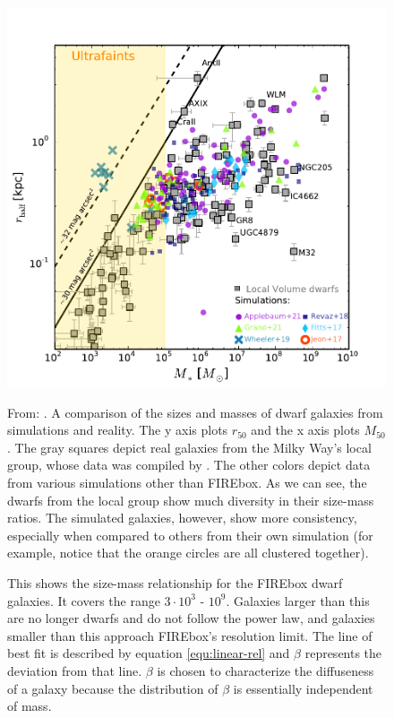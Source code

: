 \begin{figure}
    \includegraphics*[width=\textwidth]{figs/sales/fig4.pdf}
    \label{fig:sales-size-mass}
    \caption{
        From: \cite{salesBaryonicSolutionsChallenges2022}. A comparison of the sizes and masses of dwarf galaxies from simulations and reality. The y axis plots $r_{50}$ and the x axis plots $M_{50}$. The gray squares depict real galaxies from the Milky Way's local group, whose data was compiled by \cite{mcconnachieOBSERVEDPROPERTIESDWARF2012}. The other colors depict data from various simulations other than FIREbox. As we can see, the dwarfs from the local group show much diversity in their size-mass ratios. The simulated galaxies, however, show more consistency, especially when compared to others from their own simulation (for example, notice that the orange circles are all clustered together).
    }
\end{figure}

\begin{figure}
    \centering
    
    \caption{
        This shows the size-mass relationship for the FIREbox dwarf galaxies. It covers the range $3 \cdot 10^3$ - $10^9$. Galaxies larger than this are no longer dwarfs and do not follow the power law, and galaxies smaller than this approach FIREbox's resolution limit. The line of best fit is described by equation \ref{equ:linear-rel} and $\beta$ represents the deviation from that line. $\beta$ is chosen to characterize the diffuseness of a galaxy because the distribution of $\beta$ is essentially independent of mass. 
    }
    \label{fig:size-mass}
\end{figure}

